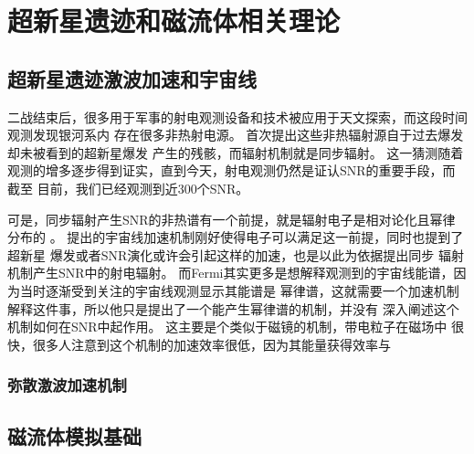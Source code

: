 \chapter{超新星遗迹和磁流体相关理论}
\label{Theory}

\section{超新星遗迹激波加速和宇宙线}
\label{TheoryDSACR}
二战结束后，很多用于军事的射电观测设备和技术被应用于天文探索，而这段时间观测发现银河系内
存在很多非热射电源。
\citet{1953AZh....30...15S}首次提出这些非热辐射源自于过去爆发却未被看到的超新星爆发
产生的残骸，而辐射机制就是同步辐射。
这一猜测随着观测的增多逐步得到证实，直到今天，射电观测仍然是证认SNR的重要手段，而截至
目前，我们已经观测到近300个SNR\citep{2014BASI...42...47G}。

可是，同步辐射产生SNR的非热谱有一个前提，就是辐射电子是相对论化且幂律分布的
\citep{1970ranp.book.....P}。
\citet{Fermi1949}提出的宇宙线加速机制刚好使得电子可以满足这一前提，同时也提到了超新星
爆发或者SNR演化或许会引起这样的加速，\citet{1953AZh....30...15S}也是以此为依据提出同步
辐射机制产生SNR中的射电辐射。
而Fermi其实更多是想解释观测到的宇宙线能谱，因为当时逐渐受到关注的宇宙线观测显示其能谱是
幂律谱，这就需要一个加速机制解释这件事，所以他只是提出了一个能产生幂律谱的机制，并没有
深入阐述这个机制如何在SNR中起作用。
这主要是个类似于磁镜的机制，带电粒子在磁场中
很快，很多人注意到这个机制的加速效率很低，因为其能量获得效率与



\subsection{弥散激波加速机制}



\section{磁流体模拟基础}
\label{ThoryMHD}
